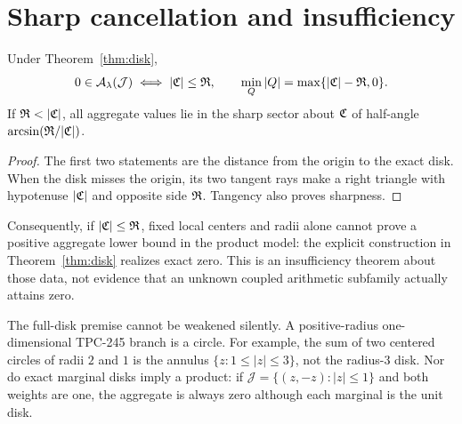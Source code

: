 \section{Sharp cancellation and insufficiency}

\begin{corollary}\label{cor:geometry}
Under Theorem~\ref{thm:disk},
\[
 0\in\mathcal A_\lambda(\mathcal J)\iff |\mathfrak{C}|\le\mathfrak{R},
 \qquad
 \min_Q|Q|=\max\{|\mathfrak{C}|-\mathfrak{R},0\}.
\]
If $\Ragg<|\Cagg|$, all aggregate values lie in the sharp sector about
$\mathfrak{C}$ of half-angle $\arcsin(\mathfrak{R}/|\mathfrak{C}|)$.
\end{corollary}

\begin{proof}
The first two statements are the distance from the origin to the exact disk.
When the disk misses the origin, its two tangent rays make a right triangle
with hypotenuse $|\mathfrak{C}|$ and opposite side $\mathfrak{R}$.  Tangency also proves
sharpness.
\end{proof}

Consequently, if $|\mathfrak{C}|\le\mathfrak{R}$, fixed local centers and radii alone cannot
prove a positive aggregate lower bound in the product model: the explicit
construction in Theorem~\ref{thm:disk} realizes exact zero.  This is an
insufficiency theorem about those data, not evidence that an unknown coupled
arithmetic subfamily actually attains zero.

The full-disk premise cannot be weakened silently.  A positive-radius
one-dimensional TPC-245 branch is a circle.  For example, the sum of two
centered circles of radii $2$ and $1$ is the annulus
$\{z:1\le|z|\le3\}$, not the radius-$3$ disk.  Nor do exact marginal disks
imply a product: if $\mathcal J=\{(z,-z):|z|\le1\}$ and both weights are one,
the aggregate is always zero although each marginal is the unit disk.
